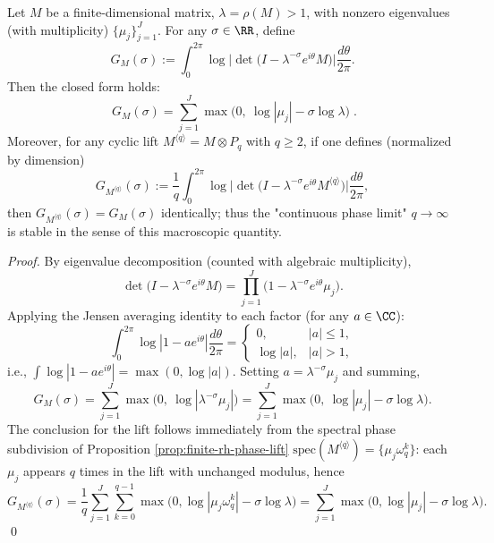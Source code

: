 \begin{proposition}\label{prop:finite-rh-jensen-free-energy}
Let \(M\) be a finite-dimensional matrix, \(\lambda=\rho(M)>1\), with nonzero eigenvalues (with multiplicity) \(\{\mu_j\}_{j=1}^{J}\).
For any \(\sigma\in\RR\), define
\[
G_M(\sigma):=\int_0^{2\pi}\log\Big|\det\bigl(I-\lambda^{-\sigma}e^{i\theta}M\bigr)\Big|\frac{d\theta}{2\pi}.
\]
Then the closed form holds:
\[
\boxed{\;
G_M(\sigma)=\sum_{j=1}^{J}\max\bigl(0,\ \log|\mu_j|-\sigma\log\lambda\bigr)\; }.
\]
Moreover, for any cyclic lift \(M^{\langle q\rangle}=M\otimes P_q\) with \(q\ge 2\), if one defines (normalized by dimension)
\[
G_{M^{\langle q\rangle}}(\sigma):=\frac{1}{q}\int_0^{2\pi}\log\Big|\det\bigl(I-\lambda^{-\sigma}e^{i\theta}M^{\langle q\rangle}\bigr)\Big|\frac{d\theta}{2\pi},
\]
then \(G_{M^{\langle q\rangle}}(\sigma)=G_M(\sigma)\) identically; thus the "continuous phase limit" \(q\to\infty\) is stable in the sense of this macroscopic quantity.
\end{proposition}
\begin{proof}
By eigenvalue decomposition (counted with algebraic multiplicity),
\[
\det\bigl(I-\lambda^{-\sigma}e^{i\theta}M\bigr)=\prod_{j=1}^{J}\bigl(1-\lambda^{-\sigma}e^{i\theta}\mu_j\bigr).
\]
Applying the Jensen averaging identity to each factor (for any \(a\in\CC\)):
\[
\int_0^{2\pi}\log|1-ae^{i\theta}|\frac{d\theta}{2\pi}
=
\begin{cases}
0,&|a|\le 1,\\
\log|a|,&|a|>1,
\end{cases}
\]
i.e.,
\(
\int \log|1-ae^{i\theta}|= \max(0,\log|a|)
\).
Setting \(a=\lambda^{-\sigma}\mu_j\) and summing,
\[
G_M(\sigma)=\sum_{j=1}^{J}\max\bigl(0,\ \log|\lambda^{-\sigma}\mu_j|\bigr)
=\sum_{j=1}^{J}\max\bigl(0,\ \log|\mu_j|-\sigma\log\lambda\bigr).
\]
The conclusion for the lift follows immediately from the spectral phase subdivision of Proposition \ref{prop:finite-rh-phase-lift}
\(\mathrm{spec}(M^{\langle q\rangle})=\{\mu_j\omega_q^k\}\):
each \(\mu_j\) appears \(q\) times in the lift with unchanged modulus, hence
\[
G_{M^{\langle q\rangle}}(\sigma)=\frac{1}{q}\sum_{j=1}^J\sum_{k=0}^{q-1}\max\bigl(0,\log|\mu_j\omega_q^k|-\sigma\log\lambda\bigr)=\sum_{j=1}^J\max\bigl(0,\log|\mu_j|-\sigma\log\lambda\bigr).
\]
\qed
\end{proof}

